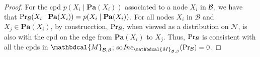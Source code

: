\documentclass[letterpaper]{article} %
\theoremstyle{plain}
\theoremstyle{definition}
\theoremstyle{remark}
\newcommand{\dg}[1]{\mathbdcal{#1}}
\newcommand\Pa{\mathbf{Pa}}
\newcommand\Inc{\mathit{Inc}}
\newcommand{\PDGof}[1]{{\dg M}_{#1}}
\begin{document}
\begin{proof}
  For the cpd $p(X_i \mid \Pa(X_i))$ associated to a node $X_i$ in 
$\cal B$, we have that $\Pr_{\cal B}(X_i
\mid \Pa(X_i)) = p(X_i \mid \Pa(X_i))$.  
For all nodes $X_i$ in $\mathcal B$ and $X_j \in \Pa(X_i)$, 
by construcction, $\Pr_{\cal B}$, when viewed as a distribution on
$\mathcal N$, is also with the cpd on the edge from $\Pa(X_i)$ to
$X_j$.
Thus, $\Pr_{\cal B}$ is consistent with all the cpds in
$\PDGof{\mathcal B, \beta}$;
so$\Inc_{\PDGof{\mathcal B,\beta}}(\Pr_{\cal B}) = 0$.


\end{proof}
\end{document}
